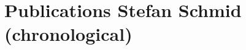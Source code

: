 \documentclass[10pt]{article}
\begin{document}
\section*{Publications Stefan Schmid (chronological)}

\end{document}
